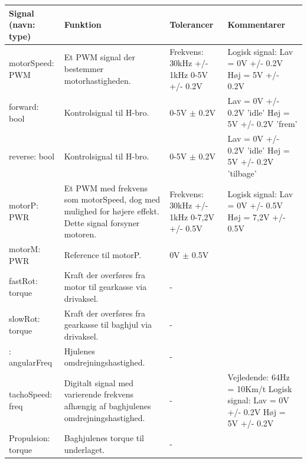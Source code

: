 \begin{table}[h]
	\centering
	\begin{tabularx}{\textwidth}{|l|Z|Z|Z|} \hline
	\textbf{Signal (navn: type)} & \textbf{Funktion} & \textbf{Tolerancer} & \textbf{Kommentarer} \\ \hline
motorSpeed: PWM
	& Et PWM signal der bestemmer motorhastigheden. 
	& Frekvens: 30kHz +/- 1kHz 0-5V +/- 0.2V
 	& Logisk signal: \newline
		Lav = 0V +/- 0.2V \newline
		Høj = 5V +/- 0.2V
	\\ \hline

forward: bool
	& Kontrolsignal til H-bro.
	& 0-5V $\pm$ 0.2V
	& Lav = 0V +/- 0.2V  ’idle’ \newline
		Høj =  5V +/- 0.2V  ’frem’
	\\ \hline
	
reverse: bool
	& Kontrolsignal til H-bro.
	& 0-5V $\pm$ 0.2V
	& Lav = 0V +/- 0.2V ’idle’ \newline
		Høj =  5V +/- 0.2V  ’tilbage’
	\\ \hline
	
motorP: PWR
	& Et PWM med frekvens som motorSpeed, dog med mulighed for højere effekt. Dette signal forsyner motoren.
	& Frekvens: 30kHz +/- 1kHz 0-7,2V +/- 0.5V

 	& Logisk signal: \newline
		Lav = 0V +/- 0.5V \newline 
		Høj = 7,2V +/- 0.5V
	\\ \hline

motorM: PWR
	& Reference til motorP.
	& 0V $\pm$ 0.5V
	& ~
	\\ \hline
	
fastRot: torque
	& Kraft der overføres fra motor til gearkasse via drivaksel.
	& - 
	& ~
	\\ \hline
	
slowRot: torque
	& Kraft der overføres fra gearkasse til baghjul via drivaksel.
	& - 
	& ~
	\\ \hline
	
: angularFreq
	& Hjulenes omdrejningshastighed.
	& - 
	& ~
	\\ \hline
	
tachoSpeed: freq
	& Digitalt signal med varierende frekvens afhængig af baghjulenes 					omdrejningshastighed.
	& - 
	& Vejledende: \newline
		64Hz = 10Km/t \newline
		Logisk signal: \newline
		Lav = 0V +/- 0.2V \newline
		Høj = 5V +/- 0.2V

	\\ \hline
	
Propulsion: torque
	& Baghjulenes torque til underlaget.
	& - 
	& ~
	\\ \hline
	\end{tabularx}
\end{table}